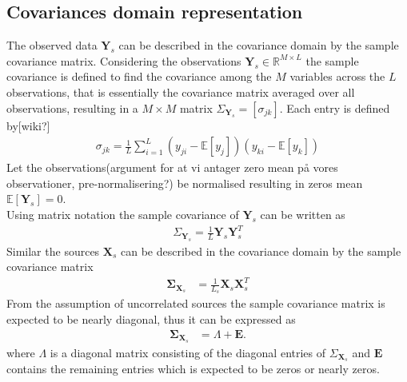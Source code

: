 \subsection{Covariances domain representation}
The observed data $\textbf{Y}_s$ can be described in the covariance domain by the sample covariance matrix. Considering the observations $\textbf{Y}_s\in \mathbb{R}^{M\times L}$ the sample covariance is defined to find the covariance among the $M$ variables across the $L$ observations, that is essentially the covariance matrix averaged over all observations, resulting in a $M\times M$ matrix $\Sigma_{\textbf{Y}_s}=[\sigma_{jk}]$. Each entry is defined by[wiki?] 
\begin{align*}
\sigma_{jk}= \frac{1}{L}\sum_{i=1}^{L}(y_{ji}-\mathbb{E}[y_j])(y_{ki}-\mathbb{E}[y_k])
\end{align*}
Let the observations(argument for at vi antager zero mean på vores observationer, pre-normalisering?) be normalised resulting in zeros mean $\mathbb{E}[\textbf{Y}_s]=0$. \\
Using matrix notation the sample covariance of $\textbf{Y}_s$ can be written as
\begin{align*}
\Sigma_{\textbf{Y}_s}= \frac{1}{L}\textbf{Y}_s\textbf{Y}_s^T
\end{align*}  
Similar the sources $\textbf{X}_s$ can be described in the covariance domain by the sample covariance matrix
\begin{align*}
\boldsymbol{\Sigma}_{\mathbf{X}_s} &= \frac{1}{L_s}\textbf{X}_s\textbf{X}_s^{T}
\end{align*}
From the assumption of uncorrelated sources the sample covariance matrix is expected to be nearly diagonal, thus it can be expressed as 
\begin{align*}
\boldsymbol{\Sigma}_{\mathbf{X}_s} &= \Lambda + \textbf{E}.
\end{align*}
where $\Lambda$ is a diagonal matrix consisting of the diagonal entries of $\Sigma_{\textbf{X}_s}$ and $\textbf{E}$ contains the remaining entries which is expected to be zeros or nearly zeros\cite{Balkan2015}.\\ \\

